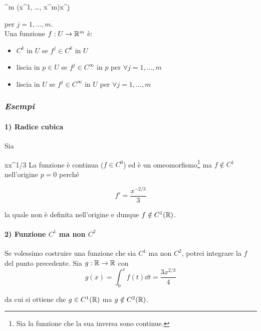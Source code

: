 	{\R^{m}}{\R}
	{(x^{1}, \dots, x^{m})}{x^{j}}
	
per $ j = 1, \dots, m $.\\
Una funzione $ f : U \to \mathbb{R}^{m} $ è:

\begin{itemize}
	\item $ C^{k} $ in $ U $ se $ f^{j} \in C^{k} $ in $ U $
	
	\item liscia in $ p \in U $ se $ f^{j} \in C^{\infty} $ in $ p $ per $ \forall j = 1, \dots, m $
	
	\item liscia in $ U $ se $ f^{j} \in C^{\infty} $ in $ U $ per $ \forall j = 1, \dots, m $
\end{itemize}

\subsubsection{\textit{Esempi}}

\paragraph{1) Radice cubica}

Sia

	{\R}{\R}
	{x}{x^{1/3}}
La funzione è continua ($ f \in C^{0} $) ed è un omeomorfismo\footnote{%
	Sia la funzione che la sua inversa sono continue.%
} ma $ f \notin C^{1} $ nell'origine $ p = 0 $ perché

\begin{equation}
	f' = \dfrac{x^{-2/3}}{3}
\end{equation}

la quale non è definita nell'origine e dunque $ f \notin C^{1} (\mathbb{R}) $.

\paragraph{2) Funzione $ C^{1} $ ma non $ C^{2} $}

Se volessimo costruire una funzione che sia $ C^{1} $ ma non $ C^{2} $, potrei integrare la $ f $ del punto precedente. Sia $ g : \mathbb{R} \to \mathbb{R} $ con
\begin{equation}
	g (x) = \int_{0}^{x} f (t) \dd{t} = \dfrac{3 x^{2/3}}{4}
\end{equation}

da cui si ottiene che $ g \in C^{1} (\mathbb{R}) $ ma $ g \notin C^{2} (\mathbb{R}) $.

